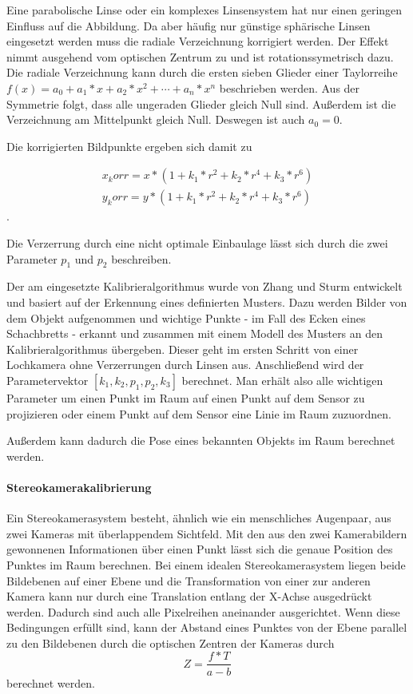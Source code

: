 Eine parabolische Linse oder ein komplexes Linsensystem hat nur einen geringen Einfluss
auf die Abbildung. Da aber häufig nur günstige sphärische Linsen eingesetzt werden
muss die radiale Verzeichnung korrigiert werden. Der Effekt nimmt ausgehend vom 
optischen Zentrum zu und ist rotationssymetrisch dazu. Die radiale Verzeichnung 
kann durch die ersten sieben Glieder einer Taylorreihe $f(x)=a_0+a_1*x+a_2*x^2+\cdots+a_n*x^n$
beschrieben werden. Aus der Symmetrie folgt, dass alle ungeraden Glieder gleich Null sind.
Außerdem ist die Verzeichnung am Mittelpunkt gleich Null. Deswegen ist auch $a_0=0$.

Die korrigierten Bildpunkte ergeben sich damit zu

  \begin{align}
 	x_korr=x*(1+k_1*r^2+k_2*r^4+k_3*r^6)\\
	y_korr=y*(1+k_1*r^2+k_2*r^4+k_3*r^6)
  \end{align}.

Die Verzerrung durch eine nicht optimale Einbaulage lässt sich durch die zwei Parameter
$p_1$ und $p_2$ beschreiben.

Der am \cob eingesetzte Kalibrieralgorithmus wurde von Zhang und Sturm entwickelt
und basiert auf der Erkennung eines definierten Musters. Dazu werden Bilder von dem 
Objekt aufgenommen und wichtige Punkte - im Fall des \cob Ecken eines Schachbretts - 
erkannt und zusammen mit einem Modell des Musters an den Kalibrieralgorithmus übergeben.
Dieser geht im ersten Schritt von einer Lochkamera ohne Verzerrungen durch Linsen aus.
Anschließend wird der Parametervektor $\left[k_1,k_2,p_1,p_2,k_3\right]$ berechnet. 
Man erhält also alle wichtigen Parameter um einen Punkt im Raum auf einen Punkt auf dem
Sensor zu projizieren oder einem Punkt auf dem Sensor eine Linie im Raum zuzuordnen.

Außerdem kann dadurch die Pose eines bekannten Objekts im Raum berechnet werden. 
\paragraph{Stereokamerakalibrierung} %
\label{par:Stereokamerakalibrierung}
Ein Stereokamerasystem besteht, ähnlich wie ein menschliches Augenpaar, aus zwei
Kameras mit überlappendem Sichtfeld. Mit den aus den zwei Kamerabildern gewonnenen
Informationen über einen Punkt lässt sich die genaue Position des Punktes im 
Raum berechnen. Bei einem idealen Stereokamerasystem liegen beide Bildebenen  auf 
einer Ebene und die Transformation von einer zur anderen Kamera kann nur durch eine
Translation entlang der X-Achse ausgedrückt werden. Dadurch sind auch alle Pixelreihen
aneinander ausgerichtet. Wenn diese Bedingungen erfüllt sind, kann der Abstand eines 
Punktes von der Ebene parallel zu den Bildebenen durch die optischen Zentren der
Kameras durch 
\begin{equation}
  Z=\frac{f*T}{a-b}
\end{equation}
berechnet werden.



